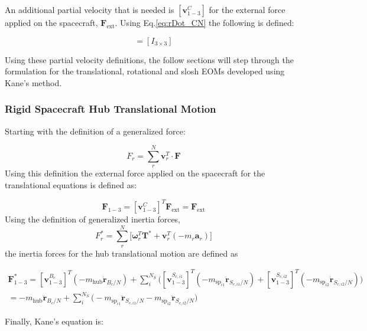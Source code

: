 An additional partial velocity that is needed is $[\bm v^C_{1-3}]$ for the external force applied on the spacecraft, $\bm F_{\text{ext}}$. Using Eq.\eqref{eq:rDot_CN} the following is defined:

\begin{equation}
	[\bm v^C_{1-3}] = [I_{3\times 3}]
\end{equation}

Using these partial velocity definitions, the follow sections will step through the formulation for the translational, rotational and slosh EOMs developed using Kane's method.

\subsubsection{Rigid Spacecraft Hub Translational Motion}

Starting with the definition of a generalized force:

\begin{equation}
	F_r = \sum\limits_{r}^{N}  \bm v_r^T \cdot \bm F
	\label{eq:genActive}
\end{equation}
Using this definition the external force applied on the spacecraft for the translational equations is defined as:

\begin{equation}
	\bm F_{1-3} = [\bm v^C_{1-3}]^T \bm F_{\text{ext}} = \bm F_{\text{ext}}
\end{equation}
Using the definition of generalized inertia forces,
\begin{equation}
	F^*_r = \sum\limits_{r}^{N}\Big[\bm \omega_r^T \bm T^* +  \bm v_r^T (- m_r \bm a_r)\Big]
	\label{eq:genInert}
\end{equation}
the inertia forces for the hub translational motion are defined as

\begin{multline}
	\bm F^*_{1-3} = [\bm v^{B_c}_{1-3}]^T (-m_{\text{hub}} \ddot{\bm r}_{B_c/N}) + \sum\limits_{i}^{N_S}\Big([\bm v^{S_{c,i1}}_{1-3}]^T (-m_{\text{sp}_{i1}} \ddot{\bm{r}}_{S_{c,{i1}}/N}) + [\bm v^{S_{c,i2}}_{1-3}]^T (-m_{\text{sp}_{i2}} \ddot{\bm{r}}_{S_{c,{i2}}/N})\Big) \\
	= -m_{\text{hub}} \ddot{\bm r}_{B_c/N} + \sum\limits_{i}^{N_S} \Big( -m_{\text{sp}_{i1}} \ddot{\bm{r}}_{S_{c,{i1}}/N} -m_{\text{sp}_{i2}} \ddot{\bm{r}}_{S_{c,{i2}}/N}\Big)
\end{multline}

Finally, Kane's equation is:

